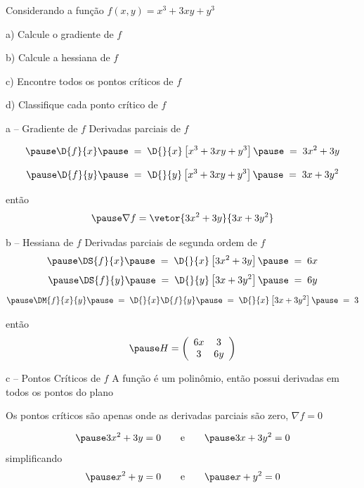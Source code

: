 \begin{question}
  Considerando a função
  \(
    f(x, y) = x^3 + 3xy + y^3
  \)

  \smallskip\quad
  a) Calcule o gradiente de $f$

  \smallskip\quad
  b) Calcule a hessiana de $f$

  \smallskip\quad
  c) Encontre todos os pontos críticos de $f$

  \smallskip\quad
  d) Classifique cada ponto crítico de $f$
\end{question}

\begin{resolution}{a -- Gradiente de $f$}
  Derivadas parciais de $f$

  \[
    \pause
    \D{f}{x}
    \pause
    \;=\; \D{}{x}\left[x^3 + 3xy + y^3\right]
    \pause
    \;=\; 3x^2 + 3y
  \]

  \[
    \pause
    \D{f}{y}
    \pause
    \;=\; \D{}{y}\left[x^3 + 3xy + y^3\right]
    \pause
    \;=\; 3x + 3y^2
  \]

  \pause
  então
  \[
    \pause
    \nabla f = \vetor{3x^2 + 3y}{3x + 3y^2}
  \]
\end{resolution}

\begin{resolution}{b -- Hessiana de $f$}
  Derivadas parciais de segunda ordem de $f$
  \[
    \pause
    \DS{f}{x}
    \pause
    \;=\; \D{}{x}\left[3x^2 + 3y\right]
    \pause
    \;=\; 6x
  \]
  \[
    \pause
    \DS{f}{y}
    \pause
    \;=\; \D{}{y}\left[3x + 3y^2\right]
    \pause
    \;=\; 6y
  \]
  \[
    \pause
    \DM{f}{x}{y}
    \pause
    \;=\; \D{}{x}\D{f}{y}
    \pause
    \;=\; \D{}{x}\left[3x + 3y^2\right]
    \pause
    \;=\; 3
  \]

  \pause
  então
  \[
    \pause
    H = \left(\begin{array}{cc}
      6x & 3 \\
      3  & 6y
    \end{array}\right)
  \]
\end{resolution}

\begin{resolution}{c -- Pontos Críticos de $f$}
  A função é um polinômio, então possui derivadas em todos os pontos do plano

  \pause
  Os pontos críticos são apenas onde as derivadas parciais são zero,
  \(\nabla f = 0\)

  \[
    \pause
    3x^2 + 3y = 0
    \qquad\text{e}\qquad
    \pause
    3x + 3y^2 = 0
  \]
  \pause
  simplificando
  \[
    \pause
    x^2 + y = 0
    \qquad\text{e}\qquad
    \pause
    x + y^2 = 0
  \]
\end{resolution}

